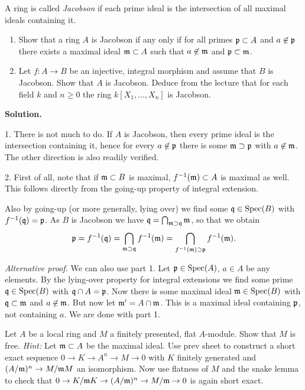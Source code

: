 \documentclass[a4paper,11pt]{article}
\begin{document}
A ring is called \textit{Jacobson} if each prime ideal is the intersection
of all maximal ideals containing it. 
\begin{enumerate}
    \item Show that a ring $A$ is Jacobson if any only if for all primes
        $\mathfrak{p} \subset A$ and $a \not \in \mathfrak{p}$ there exists a 
        maximal ideal $\mathfrak{m} \subset A$ such that $a \not \in \mathfrak{m}$
        and $\mathfrak{p} \subset \mathfrak{m}$. 
    \item Let $f: A\to B$ be an injective, integral morphism and assume that 
        $B$ is Jacobson. Show that $A$ is Jacobson. Deduce from the lecture
        that for each field $k$ and $n \geq 0$ the ring
        $k[X_1, \dots, X_n]$ is Jacobson.
\end{enumerate}

\textbf{Solution.}

\textsc{1.} There is not much to do. If $A$ is Jacobson, then every prime 
ideal is the intersection containing it, hence for every $a \not \in \mathfrak{p}$ there
is some $\mathfrak{m} \supset \mathfrak{p}$ with $a \not \in \mathfrak{m}$. The other direction is also readily
verified.

\textsc{2.} First of all, note that if $\mathfrak{m} \subset B$ is maximal, $f^{-1}(\mathfrak{m})
\subset A$ is maximal as well. This follows directly from the going-up property
of integral extension. 

Also by going-up (or more generally, lying over) we find some $\mathfrak{q} \in \operatorname{Spec}(B)$
with $f^{-1}(\mathfrak{q}) = \mathfrak{p}$. As $B$ is Jacobson we have $\mathfrak{q} = \bigcap_{\mathfrak{m} \supset
\mathfrak{q}} \mathfrak{m}$, so that we obtain 
$$\mathfrak{p} = f^{-1}(\mathfrak{q}) = \bigcap_{\mathfrak{m} \supset \mathfrak{q}} f^{-1}(\mathfrak{m}) = 
\bigcap_{f^{-1}(\mathfrak{m}) \supset \mathfrak{p}} f^{-1}(\mathfrak{m}).$$

\textit{Alternative proof.} We can also use part 1. Let 
$\mathfrak{p} \in \operatorname{Spec}(A)$, $a \in A$ be any elements. By the lying-over property for
integral extensions we find some prime $\mathfrak{q} \in \operatorname{Spec}(B)$ with
$\mathfrak{q} \cap A = \mathfrak{p}$. Now there is some maximal ideal $\mathfrak{m} \in \operatorname{Spec}(B)$ 
with $\mathfrak{q} \subset \mathfrak{m}$ and $a \not \in \mathfrak{m}$. But now let $\mathfrak{m}' = A \cap \mathfrak{m}$.
This is a maximal ideal containing $\mathfrak{p}$, not containing $a$. We are done with 
part 1.


Let $A$ be a local ring and $M$ a finitely presented, flat $A$-module.
Show that $M$ is free. \textit{Hint:} Let $\mathfrak{m} \subset A$ be the maximal ideal.
Use prev sheet to construct a short exact sequence $0 \to K \to A^n \to M \to 0$
with $K$ finitely generated and $(A/\mathfrak{m})^n \to M/\mathfrak{m} M$ an isomorphism.
Now use flatness of $M$ and the snake lemma to check that $0 \to K/\mathfrak{m} K
\to (A/\mathfrak{m})^n \to M/\mathfrak{m} \to 0$ is again short exact.
\end{document}
